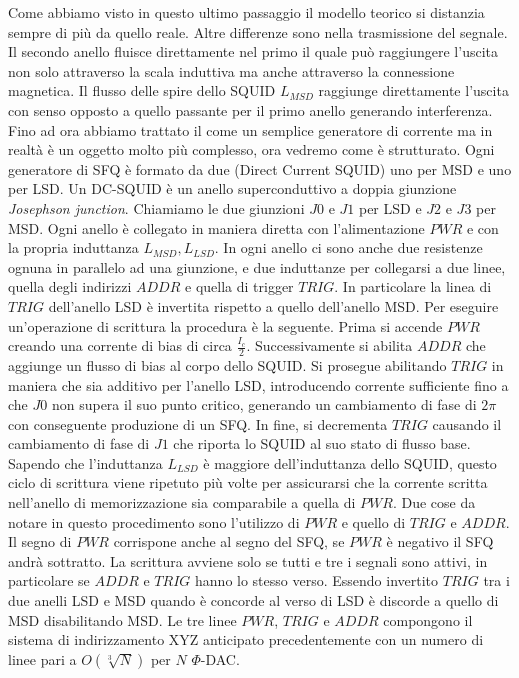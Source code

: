Come abbiamo visto in questo ultimo passaggio il modello teorico si distanzia sempre di più da quello reale. Altre differenze sono nella trasmissione del segnale. Il secondo anello fluisce direttamente nel primo il quale può raggiungere l'uscita non solo attraverso la scala induttiva ma anche attraverso la connessione magnetica. Il flusso delle spire dello SQUID $L_{MSD}$ raggiunge direttamente l'uscita con senso opposto a quello passante per il primo anello generando interferenza.
\cite{ACI}Fino ad ora abbiamo trattato il  come un semplice generatore di corrente ma in realtà è un oggetto molto più complesso, ora vedremo come è strutturato. Ogni generatore di SFQ è formato da due  (Direct Current SQUID) uno per MSD e uno per LSD. Un DC-SQUID è un anello superconduttivo a doppia giunzione \textit{Josephson junction}. Chiamiamo le due giunzioni $J0$ e $J1$ per LSD e $J2$ e $J3$ per MSD. Ogni anello è collegato in maniera diretta con l'alimentazione $PWR$ e con la propria induttanza $L_{MSD}, L_{LSD}$. In ogni anello ci sono anche due resistenze ognuna in parallelo ad una giunzione, e due induttanze per collegarsi a due linee, quella degli indirizzi $ADDR$ e quella di trigger $TRIG$. In particolare la linea di $TRIG$ dell'anello LSD è invertita rispetto a quello dell'anello MSD. Per eseguire un'operazione di scrittura la procedura è la seguente. Prima si accende $PWR$ creando una corrente di bias di circa $\frac{I_c}{2}$. Successivamente si abilita $ADDR$ che aggiunge un flusso di bias al corpo dello SQUID. Si prosegue abilitando $TRIG$ in maniera che sia additivo per l'anello LSD, introducendo corrente sufficiente fino a che $J0$ non supera il suo punto critico, generando un cambiamento di fase di $2\pi$ con conseguente produzione di un SFQ.
In fine, si decrementa $TRIG$ causando il cambiamento di fase di $J1$ che riporta lo SQUID al suo stato di flusso base. Sapendo che l'induttanza $L_{LSD}$ è maggiore dell'induttanza dello SQUID, questo ciclo di scrittura viene ripetuto più volte per assicurarsi che la corrente scritta nell'anello di memorizzazione sia comparabile a quella di $PWR$. Due cose da notare in questo procedimento sono l'utilizzo di $PWR$ e quello di $TRIG$ e $ADDR$. Il segno di $PWR$ corrispone anche al segno del SFQ, se $PWR$ è negativo il SFQ andrà sottratto. La scrittura avviene solo se tutti e tre i segnali sono attivi, in particolare se $ADDR$ e $TRIG$ hanno lo stesso verso. Essendo invertito $TRIG$ tra i due anelli LSD e MSD quando è concorde al verso di LSD è discorde a quello di MSD disabilitando MSD. Le tre linee $PWR$, $TRIG$ e $ADDR$ compongono il sistema di indirizzamento XYZ anticipato precedentemente con un numero di linee pari a $O(\sqrt[3]{N})$ per $N$ $\Phi$-DAC.
